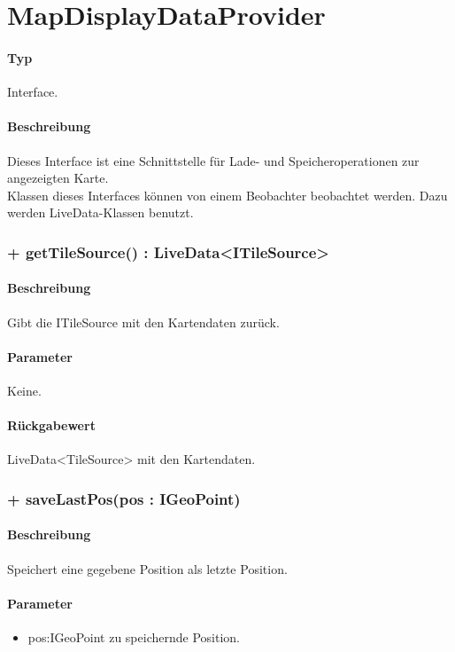 \section{MapDisplayDataProvider}
\paragraph*{Typ}
Interface.
\paragraph*{Beschreibung}
Dieses Interface ist eine Schnittstelle für Lade- und Speicheroperationen zur angezeigten Karte.\\
Klassen dieses Interfaces können von einem Beobachter beobachtet werden. Dazu werden 
LiveData-Klassen benutzt.

\subsubsection{+ getTileSource() : LiveData<ITileSource>}%
\paragraph*{Beschreibung}
Gibt die ITileSource mit den Kartendaten zurück.
\paragraph*{Parameter}
Keine.
\paragraph*{Rückgabewert}
LiveData<TileSource> mit den Kartendaten.

\subsubsection{+ saveLastPos(pos : IGeoPoint)}%
\paragraph*{Beschreibung}
Speichert eine gegebene Position als letzte Position.
\paragraph*{Parameter}
\begin{itemize}
    \item pos:IGeoPoint zu speichernde Position.
\end{itemize}
